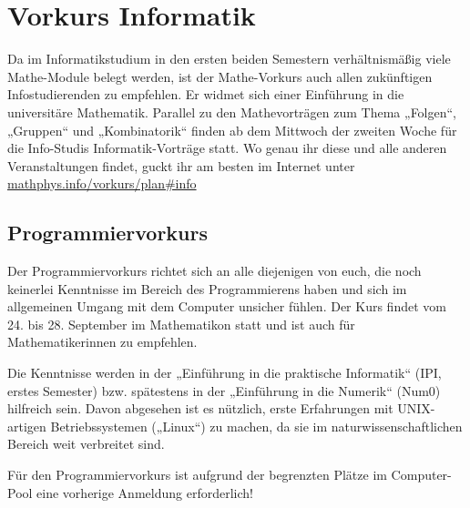 \section{Vorkurs Informatik}
Da im Informatikstudium in den ersten beiden Semestern verhältnismäßig viele Mathe-Module belegt werden, ist der Mathe-Vorkurs auch allen zukünftigen Infostudierenden zu empfehlen. Er widmet sich einer Einführung in die universitäre Mathematik. 
Parallel zu den Mathevorträgen zum Thema „Folgen“, „Gruppen“ und „Kombinatorik“ finden ab dem Mittwoch der zweiten Woche für die Info-Studis Informatik-Vorträge statt. Wo genau ihr diese und alle anderen Veranstaltungen findet, guckt ihr am besten im Internet unter \url{mathphys.info/vorkurs/plan\#info}%


\subsection{Programmiervorkurs}
Der Programmiervorkurs richtet sich an alle diejenigen von euch, die noch keinerlei Kenntnisse im Bereich des Programmierens haben und sich im allgemeinen Umgang mit dem Computer unsicher fühlen. Der Kurs findet vom 24. bis 28. September im Mathematikon statt und ist auch für Mathematikerinnen zu empfehlen.

Die Kenntnisse werden in der „Einführung in die praktische Informatik“ (\gls{IPI}, erstes Semester) bzw. spätestens in der „Einführung in die Numerik“ (\gls{Num0}) hilfreich sein. Davon abgesehen ist es nützlich, erste Erfahrungen mit UNIX-artigen Betriebssystemen („Linux“) zu machen, da sie im naturwissenschaftlichen Bereich weit verbreitet sind.

Für den Programmiervorkurs ist aufgrund der begrenzten Plätze im Computer-Pool eine vorherige Anmeldung erforderlich!
